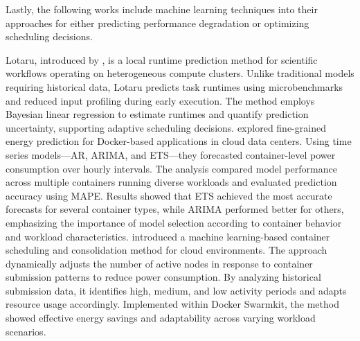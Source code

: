 Lastly, the following works include machine learning techniques into their approaches for either predicting performance degradation or optimizing scheduling decisions.

Lotaru, introduced by \cite{BADER2024171}, is a local runtime prediction method for scientific workflows operating on heterogeneous compute clusters. Unlike traditional models requiring historical data, Lotaru predicts task runtimes using microbenchmarks and reduced input profiling during early execution. The method employs Bayesian linear regression to estimate runtimes and quantify prediction uncertainty, supporting adaptive scheduling decisions.
\cite{10496576} explored fine-grained energy prediction for Docker-based applications in cloud data centers. Using time series models—AR, ARIMA, and ETS—they forecasted container-level power consumption over hourly intervals. The analysis compared model performance across multiple containers running diverse workloads and evaluated prediction accuracy using MAPE. Results showed that ETS achieved the most accurate forecasts for several container types, while ARIMA performed better for others, emphasizing the importance of model selection according to container behavior and workload characteristics.
\cite{10.1007/978-3-030-30143-9_15} introduced a machine learning-based container scheduling and consolidation method for cloud environments. The approach dynamically adjusts the number of active nodes in response to container submission patterns to reduce power consumption. By analyzing historical submission data, it identifies high, medium, and low activity periods and adapts resource usage accordingly. Implemented within Docker Swarmkit, the method showed effective energy savings and adaptability across varying workload scenarios.






